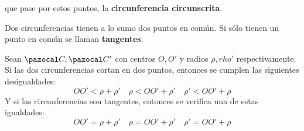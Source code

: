                                                                                                                                                                                                                                                                                                                                                                                                                                                                                                                                                                                                                                                                                                                                                                                                                                                                                                                                                                                                                                                                                                                                                                                                                                                                                                                                                                                                                                                                                                                                                                                                                                                                    que pase por estos puntos, la \textbf{circunferencia circunscrita}.

 Dos circunferencias tienen a lo sumo dos puntos en común. Si sólo tienen un punto en común se llaman \textbf{tangentes}.

\importante {} Sean $\C, \C'$ con centros $O, O'$ y radios $\rho, rho'$ respectivamente. Si las dos circunferencias cortan en dos puntos, entonces se cumplen las siguientes desigualdades:
$$OO' < \rho+\rho' \quad \rho < OO'+\rho' \quad \rho' < OO' + \rho$$
Y si las circunferencias son tangentes, entonces se verifica una de estas igualdades:
$$OO' = \rho+\rho' \quad \rho = OO'+\rho' \quad \rho' =   OO' + \rho$$      